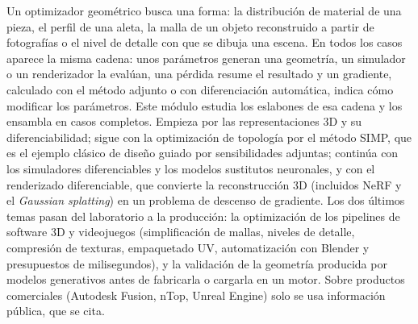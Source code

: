 \documentclass[11pt,a4paper,twoside,openany]{book}
\begin{document}
Un optimizador geométrico busca una forma: la distribución de material de una pieza, el perfil de una aleta, la malla de un objeto reconstruido a partir de fotografías o el nivel de detalle con que se dibuja una escena. En todos los casos aparece la misma cadena: unos parámetros generan una geometría, un simulador o un renderizador la evalúan, una pérdida resume el resultado y un gradiente, calculado con el método adjunto o con diferenciación automática, indica cómo modificar los parámetros. Este módulo estudia los eslabones de esa cadena y los ensambla en casos completos. Empieza por las representaciones 3D y su diferenciabilidad; sigue con la optimización de topología por el método SIMP, que es el ejemplo clásico de diseño guiado por sensibilidades adjuntas; continúa con los simuladores diferenciables y los modelos sustitutos neuronales, y con el renderizado diferenciable, que convierte la reconstrucción 3D (incluidos NeRF y el \emph{Gaussian splatting}) en un problema de descenso de gradiente. Los dos últimos temas pasan del laboratorio a la producción: la optimización de los pipelines de software 3D y videojuegos (simplificación de mallas, niveles de detalle, compresión de texturas, empaquetado UV, automatización con Blender y presupuestos de milisegundos), y la validación de la geometría producida por modelos generativos antes de fabricarla o cargarla en un motor. Sobre productos comerciales (Autodesk Fusion, nTop, Unreal Engine) solo se usa información pública, que se cita.
\end{document}
